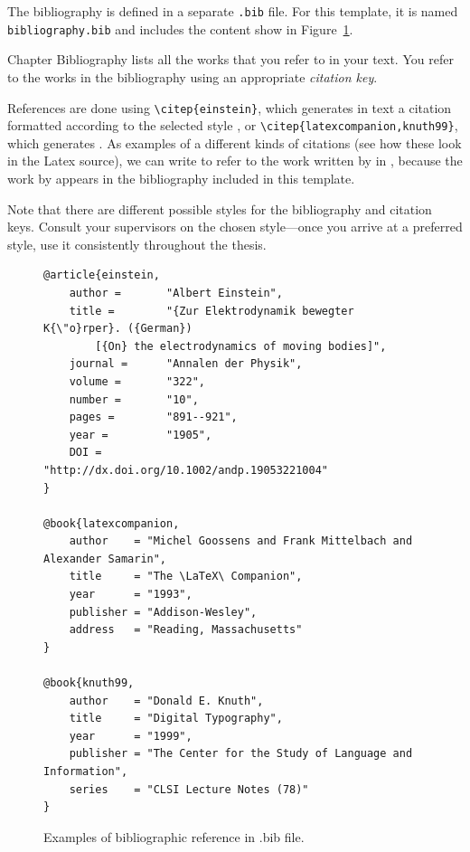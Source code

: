 The bibliography is defined in a separate \texttt{.bib} file. For this template, it is named\\
\texttt{bibliography.bib} and includes the content show in Figure~\ref{bibexamples}.

Chapter Bibliography lists all the works that you refer to in your text. You refer to the works in the bibliography using an appropriate \emph{citation key}.
%


References are done using \texttt{\textbackslash citep\{einstein\}}, which generates in text a citation formatted according to the selected style \citep{einstein}, or \texttt{\textbackslash citep\{latexcompanion,knuth99\}}, which generates \citep{latexcompanion,knuth99}. 
As examples of a different kinds of citations (see how these look in the Latex source), we can write \citep{einstein} to refer to the work written by \citeauthor{einstein} in \citeyear{einstein}, because the work by \citet{einstein} appears in the bibliography included in this template.

Note that there are different possible styles for the bibliography and citation keys.
%
Consult your supervisors on the chosen style---once you arrive at a preferred style, use it consistently throughout the thesis.

\begin{figure}[ht]
    \centering
    \begin{scriptsize}
\begin{verbatim}
@article{einstein,
    author =       "Albert Einstein",
    title =        "{Zur Elektrodynamik bewegter K{\"o}rper}. ({German})
        [{On} the electrodynamics of moving bodies]",
    journal =      "Annalen der Physik",
    volume =       "322",
    number =       "10",
    pages =        "891--921",
    year =         "1905",
    DOI =          "http://dx.doi.org/10.1002/andp.19053221004"
}
 
@book{latexcompanion,
    author    = "Michel Goossens and Frank Mittelbach and Alexander Samarin",
    title     = "The \LaTeX\ Companion",
    year      = "1993",
    publisher = "Addison-Wesley",
    address   = "Reading, Massachusetts"
}

@book{knuth99,
    author    = "Donald E. Knuth",
    title     = "Digital Typography",
    year      = "1999",
    publisher = "The Center for the Study of Language and Information",
    series    = "CLSI Lecture Notes (78)"
}\end{verbatim}
\end{scriptsize}
    \caption{Examples of bibliographic reference in .bib file.}
    \label{bibexamples}
\end{figure}

